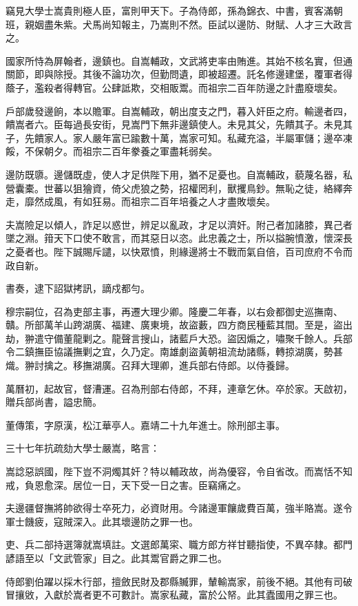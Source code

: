 \begin{pinyinscope}
竊見大學士嵩貴則極人臣，富則甲天下。子為侍郎，孫為錦衣、中書，賓客滿朝班，親姻盡朱紫。犬馬尚知報主，乃嵩則不然。臣試以邊防、財賦、人才三大政言之。

國家所恃為屏翰者，邊鎮也。自嵩輔政，文武將吏率由賄進。其始不核名實，但通關節，即與除授。其後不論功次，但勤問遺，即被超遷。託名修邊建堡，覆軍者得蔭子，濫殺者得轉官。公肆詆欺，交相販鬻。而祖宗二百年防邊之計盡廢壞矣。

戶部歲發邊餉，本以贍軍。自嵩輔政，朝出度支之門，暮入奸臣之府。輸邊者四，饋嵩者六。臣每過長安街，見嵩門下無非邊鎮使人。未見其父，先饋其子。未見其子，先饋家人。家人嚴年富已踰數十萬，嵩家可知。私藏充溢，半屬軍儲；邊卒凍餒，不保朝夕。而祖宗二百年豢養之軍盡耗弱矣。

邊防既隳。邊儲既虛，使人才足供陛下用，猶不足憂也。自嵩輔政，藐蔑名器，私營囊橐。世蕃以狙獪資，倚父虎狼之勢，招權罔利，獸攫鳥鈔。無恥之徒，絡繹奔走，靡然成風，有如狂易。而祖宗二百年培養之人才盡敗壞矣。

夫嵩險足以傾人，詐足以惑世，辨足以亂政，才足以濟奸。附己者加諸膝，異己者墜之淵。箝天下口使不敢言，而其惡日以恣。此忠義之士，所以搤腕憤激，懷深長之憂者也。陛下誠賜斥譴，以快眾憤，則緣邊將士不戰而氣自倍，百司庶府不令而政自新。

書奏，逮下詔獄拷訊，謫戍都勻。

穆宗嗣位，召為吏部主事，再遷大理少卿。隆慶二年春，以右僉都御史巡撫南、贛。所部萬羊山跨湖廣、福建、廣東境，故盜藪，四方商民種藍其間。至是，盜出劫，翀遣守備董龍剿之。龍聲言搜山，諸藍戶大恐。盜因煽之，嘯聚千餘人。兵部令二鎮撫臣協議撫剿之宜，久乃定。南雄劇盜黃朝祖流劫諸縣，轉掠湖廣，勢甚熾。翀討擒之。移撫湖廣。召拜大理卿，進兵部右侍郎。以侍養歸。

萬曆初，起故官，督漕運。召為刑部右侍郎，不拜，連章乞休。卒於家。天啟初，贈兵部尚書，謚忠簡。

董傳策，字原漢，松江華亭人。嘉靖二十九年進士。除刑部主事。

三十七年抗疏劾大學士嚴嵩，略言：

嵩諗惡誤國，陛下豈不洞燭其奸？特以輔政故，尚為優容，令自省改。而嵩恬不知戒，負恩愈深。居位一日，天下受一日之害。臣竊痛之。

夫邊疆督撫將帥欲得士卒死力，必資財用。今諸邊軍饟歲費百萬，強半賂嵩。遂令軍士饑疲，寇賊深入。此其壞邊防之罪一也。

吏、兵二部持選簿就嵩填註。文選郎萬寀、職方郎方祥甘聽指使，不異卒隸。都門諺語至以「文武管家」目之。此其鬻官爵之罪二也。

侍郎劉伯躍以採木行部，擅斂民財及郡縣贓罪，輦輸嵩家，前後不絕。其他有司破冒攘敓，入獻於嵩者更不可數計。嵩家私藏，富於公帑。此其蠹國用之罪三也。


\end{pinyinscope}
